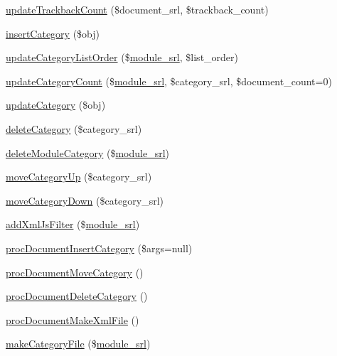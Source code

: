 \begin{DoxyCompactItemize}
\item 
\hyperlink{classdocumentController_ab932f88ad36638495bb5db441737edef}{update\-Trackback\-Count} (\$document\-\_\-srl, \$trackback\-\_\-count)
\item 
\hyperlink{classdocumentController_a5809b6e744e354b7979788f8a4d2d825}{insert\-Category} (\$obj)
\item 
\hyperlink{classdocumentController_a6f3fe3265fd98035ffdd849a03dbe45c}{update\-Category\-List\-Order} (\$\hyperlink{ko_8install_8php_a370bb6450fab1da3e0ed9f484a38b761}{module\-\_\-srl}, \$list\-\_\-order)
\item 
\hyperlink{classdocumentController_a6c2c3cad331e43a7fff774142fe62d00}{update\-Category\-Count} (\$\hyperlink{ko_8install_8php_a370bb6450fab1da3e0ed9f484a38b761}{module\-\_\-srl}, \$category\-\_\-srl, \$document\-\_\-count=0)
\item 
\hyperlink{classdocumentController_a7a4e53cda0765a416280e403b6193b0a}{update\-Category} (\$obj)
\item 
\hyperlink{classdocumentController_ad5840bc0f6ed0040779c5d90d8c327a6}{delete\-Category} (\$category\-\_\-srl)
\item 
\hyperlink{classdocumentController_a8a357bcedee02e8fda122ed24f2a9c1c}{delete\-Module\-Category} (\$\hyperlink{ko_8install_8php_a370bb6450fab1da3e0ed9f484a38b761}{module\-\_\-srl})
\item 
\hyperlink{classdocumentController_a16a00fabad8b270e40d7fa196350280c}{move\-Category\-Up} (\$category\-\_\-srl)
\item 
\hyperlink{classdocumentController_ab6befd47268a1fbfcc56dda3c3a71dc4}{move\-Category\-Down} (\$category\-\_\-srl)
\item 
\hyperlink{classdocumentController_a1fe6155cfd253e19d0583cc74a2cab35}{add\-Xml\-Js\-Filter} (\$\hyperlink{ko_8install_8php_a370bb6450fab1da3e0ed9f484a38b761}{module\-\_\-srl})
\item 
\hyperlink{classdocumentController_aad9894e1432083a62a883568c7b3a42b}{proc\-Document\-Insert\-Category} (\$args=null)
\item 
\hyperlink{classdocumentController_a6bb8b84c1f775b59f74ef8d68ba48f55}{proc\-Document\-Move\-Category} ()
\item 
\hyperlink{classdocumentController_a60d6012f96c71ee539d4152bc2c6f994}{proc\-Document\-Delete\-Category} ()
\item 
\hyperlink{classdocumentController_a749d60be23e4645a5656a82a4fae1962}{proc\-Document\-Make\-Xml\-File} ()
\item 
\hyperlink{classdocumentController_a75dc24adc286b03e6eeb23eb7f771d8f}{make\-Category\-File} (\$\hyperlink{ko_8install_8php_a370bb6450fab1da3e0ed9f484a38b761}{module\-\_\-srl})

\end{DoxyCompactItemize}
